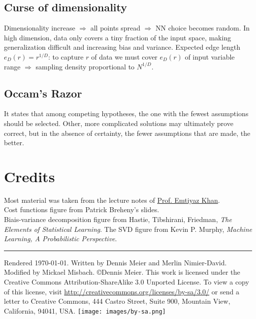 \documentclass[10pt,a4paper,landscape]{extarticle}
\begin{document}
\begin{multicols*}{4}
\subsection{Curse of dimensionality}
Dimensionality increase $\Rightarrow$ all points spread $\Rightarrow$ NN choice becomes random. 
In high dimension, data only covers a tiny fraction of the input space, making generalization difficult and increasing bias and variance.
Expected edge length $e_D(r) = r^{1/D}$: to capture $r$ of data we must cover $e_D(r)$ of input variable range $\Rightarrow$ sampling density proportional to $N^{1/D}$.





\subsection{Occam's Razor}
It states that among competing hypotheses, the one with the fewest assumptions should be selected. Other, more complicated solutions may ultimately prove correct, but in the absence of certainty, the fewer assumptions that are made, the better.


\section{Credits}
Most material was taken from the lecture notes of \href{http://people.epfl.ch/228491}{Prof. Emtiyaz Khan}.\\
Cost functions figure from Patrick Breheny's slides.\\
Biais-variance decomposition figure from Hastie, Tibshirani, Friedman, \textit{The Elements of Statistical Learning}.
The SVD figure from Kevin P. Murphy, \textit{Machine Learning, A Probabilistic Perspective}.

\hrule
\tiny
Rendered \today. Written by Dennis Meier and Merlin Nimier-David. Modified by Mickael Misbach.
\copyright Dennis Meier. This work is licensed under the Creative Commons Attribution-ShareAlike 3.0 Unported License.
To view a copy of this license, visit \href{http://creativecommons.org/licenses/by-sa/3.0/}{http://creativecommons.org/licenses/by-sa/3.0/} or
send a letter to Creative Commons, 444 Castro Street, Suite 900, Mountain View, California, 94041, USA.
\texttt{[image: images/by-sa.png]}

\end{multicols*}
\end{document}
